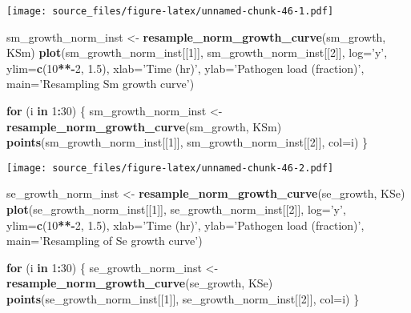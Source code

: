 \documentclass[]{article}
\newenvironment{Shaded}{\begin{snugshade}}{\end{snugshade}}
\newcommand{\KeywordTok}[1]{\textcolor[rgb]{0.13,0.29,0.53}{\textbf{#1}}}
\newcommand{\DataTypeTok}[1]{\textcolor[rgb]{0.13,0.29,0.53}{#1}}
\newcommand{\DecValTok}[1]{\textcolor[rgb]{0.00,0.00,0.81}{#1}}
\newcommand{\FloatTok}[1]{\textcolor[rgb]{0.00,0.00,0.81}{#1}}
\newcommand{\StringTok}[1]{\textcolor[rgb]{0.31,0.60,0.02}{#1}}
\newcommand{\ControlFlowTok}[1]{\textcolor[rgb]{0.13,0.29,0.53}{\textbf{#1}}}
\newcommand{\OperatorTok}[1]{\textcolor[rgb]{0.81,0.36,0.00}{\textbf{#1}}}
\newcommand{\NormalTok}[1]{#1}
\begin{document}
\texttt{[image: source\_files/figure-latex/unnamed-chunk-46-1.pdf]}

\begin{Shaded}
\begin{Highlighting}[]
\NormalTok{sm_growth_norm_inst <-}\StringTok{ }\KeywordTok{resample_norm_growth_curve}\NormalTok{(sm_growth, KSm)}
\KeywordTok{plot}\NormalTok{(sm_growth_norm_inst[[}\DecValTok{1}\NormalTok{]], sm_growth_norm_inst[[}\DecValTok{2}\NormalTok{]], }
     \DataTypeTok{log=}\StringTok{'y'}\NormalTok{, }
     \DataTypeTok{ylim=}\KeywordTok{c}\NormalTok{(}\DecValTok{10}\OperatorTok{**-}\DecValTok{2}\NormalTok{, }\FloatTok{1.5}\NormalTok{), }
     \DataTypeTok{xlab=}\StringTok{'Time (hr)'}\NormalTok{,}
     \DataTypeTok{ylab=}\StringTok{'Pathogen load (fraction)'}\NormalTok{,}
     \DataTypeTok{main=}\StringTok{'Resampling Sm growth curve'}\NormalTok{)}

\ControlFlowTok{for}\NormalTok{ (i }\ControlFlowTok{in} \DecValTok{1}\OperatorTok{:}\DecValTok{30}\NormalTok{) \{}
\NormalTok{  sm_growth_norm_inst <-}\StringTok{ }\KeywordTok{resample_norm_growth_curve}\NormalTok{(sm_growth, KSm)}
  \KeywordTok{points}\NormalTok{(sm_growth_norm_inst[[}\DecValTok{1}\NormalTok{]], sm_growth_norm_inst[[}\DecValTok{2}\NormalTok{]], }\DataTypeTok{col=}\NormalTok{i)}
\NormalTok{\}}
\end{Highlighting}
\end{Shaded}

\texttt{[image: source\_files/figure-latex/unnamed-chunk-46-2.pdf]}

\begin{Shaded}
\begin{Highlighting}[]
\NormalTok{se_growth_norm_inst <-}\StringTok{ }\KeywordTok{resample_norm_growth_curve}\NormalTok{(se_growth, KSe)}
\KeywordTok{plot}\NormalTok{(se_growth_norm_inst[[}\DecValTok{1}\NormalTok{]], se_growth_norm_inst[[}\DecValTok{2}\NormalTok{]], }
     \DataTypeTok{log=}\StringTok{'y'}\NormalTok{, }
     \DataTypeTok{ylim=}\KeywordTok{c}\NormalTok{(}\DecValTok{10}\OperatorTok{**-}\DecValTok{2}\NormalTok{, }\FloatTok{1.5}\NormalTok{), }
     \DataTypeTok{xlab=}\StringTok{'Time (hr)'}\NormalTok{,}
     \DataTypeTok{ylab=}\StringTok{'Pathogen load (fraction)'}\NormalTok{,}
     \DataTypeTok{main=}\StringTok{'Resampling of Se growth curve'}\NormalTok{)}

\ControlFlowTok{for}\NormalTok{ (i }\ControlFlowTok{in} \DecValTok{1}\OperatorTok{:}\DecValTok{30}\NormalTok{) \{}
\NormalTok{  se_growth_norm_inst <-}\StringTok{ }\KeywordTok{resample_norm_growth_curve}\NormalTok{(se_growth, KSe)}
  \KeywordTok{points}\NormalTok{(se_growth_norm_inst[[}\DecValTok{1}\NormalTok{]], se_growth_norm_inst[[}\DecValTok{2}\NormalTok{]], }\DataTypeTok{col=}\NormalTok{i)}
\NormalTok{\}}
\end{Highlighting}
\end{Shaded}
\end{document}

